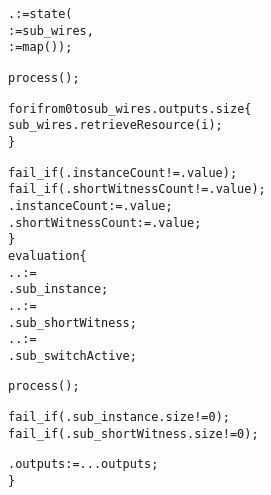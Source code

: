 \begin{alltt}
    . := state(
       := sub_wires,
       := map());

    process();

    for i from 0 to sub_wires.outputs.size \{
      sub_wires.retrieveResource(i);
    \}

    fail_if(.instanceCount != .value);
    fail_if(.shortWitnessCount != .value);
    .instanceCount := .value;
    .shortWitnessCount := .value;
  \}
  evaluation \{
    .. :=
      .sub_instance;
    .. :=
      .sub_shortWitness;
      .. :=
      .sub_switchActive;

    process();

    fail_if(.sub_instance.size != 0);
    fail_if(.sub_shortWitness.size != 0);

    .outputs := ...outputs;
  \}
\end{alltt}
